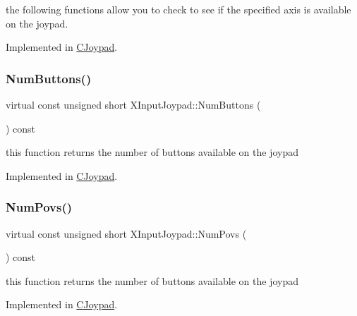 the following functions allow you to check to see if the specified axis is available on the joypad. 

Implemented in \hyperlink{class_c_joypad_aad2ba56e14016ef5cd7120b6097caa8c}{C\+Joypad}.

\mbox{\label{struct_x_input_joypad_a9bc1d9930ca27e815b05542a7fd38a39}} 
\subsubsection{\texorpdfstring{Num\+Buttons()}{NumButtons()}}
{\footnotesize\ttfamily virtual const unsigned short X\+Input\+Joypad\+::\+Num\+Buttons (\begin{DoxyParamCaption}{ }\end{DoxyParamCaption}) const\hspace{0.3cm}{\ttfamily [pure virtual]}}

this function returns the number of buttons available on the joypad 

Implemented in \hyperlink{class_c_joypad_ab3a3683d1b12e2071af4751afc2d749c}{C\+Joypad}.

\mbox{\label{struct_x_input_joypad_a715b4a23b83fa39ca3940f4e2f45c852}} 
\subsubsection{\texorpdfstring{Num\+Povs()}{NumPovs()}}
{\footnotesize\ttfamily virtual const unsigned short X\+Input\+Joypad\+::\+Num\+Povs (\begin{DoxyParamCaption}{ }\end{DoxyParamCaption}) const\hspace{0.3cm}{\ttfamily [pure virtual]}}

this function returns the number of buttons available on the joypad 

Implemented in \hyperlink{class_c_joypad_af40e2d5725c3e4d6bdc772e24bb52dca}{C\+Joypad}.

\mbox{\label{struct_x_input_joypad_a2f270f296bcaf98089ab23f74a6e9937}} 

